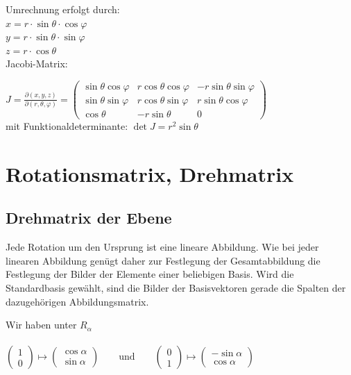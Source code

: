 Umrechnung erfolgt durch: \\
$x = r \cdot \sin \theta \cdot \cos \varphi$ \\
$y = r \cdot \sin \theta \cdot \sin \varphi$ \\
$z = r \cdot \cos \theta$ \\

Jacobi-Matrix:

$J =\frac{\partial(x,y,z)}{\partial(r,\theta,\varphi)}
  =\begin{pmatrix}
     \sin\theta\cos\varphi&r\cos\theta\cos\varphi&-r\sin\theta\sin\varphi\\
     \sin\theta \sin\varphi&r\cos\theta\sin\varphi&r\sin\theta\cos\varphi\\
     \cos\theta&-r\sin\theta&0
   \end{pmatrix}$\\
   
   mit Funktionaldeterminante:
   $\det J=r^2\sin\theta$








\section{Rotationsmatrix, Drehmatrix}

\subsection{Drehmatrix der Ebene}
Jede Rotation um den Ursprung ist eine lineare Abbildung. Wie bei jeder linearen Abbildung genügt daher zur Festlegung der Gesamtabbildung die Festlegung der Bilder der Elemente einer beliebigen Basis. Wird die Standardbasis gewählt, sind die Bilder der Basisvektoren gerade die Spalten der dazugehörigen Abbildungsmatrix.

Wir haben unter $R_{\alpha}$ \\
\\
 $\begin{pmatrix} 1 \\ 0 \end{pmatrix} \mapsto \begin{pmatrix} \cos\alpha \\ \sin\alpha \end{pmatrix}
\qquad\text{und}\qquad
\begin{pmatrix} 0 \\ 1 \end{pmatrix} \mapsto \begin{pmatrix} -\sin\alpha \\ \cos\alpha \end{pmatrix}$ \newline

